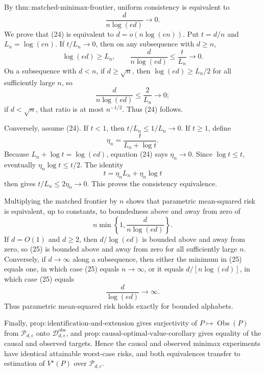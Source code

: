 By \(\mathrm{thm:matched\mbox{-}minimax\mbox{-}frontier}\), uniform consistency is equivalent to
\[
 \frac d{n\log(ed)}\longrightarrow0.                               \tag{24}
\]
We prove that (24) is equivalent to \(d=o(n\log(en))\).  Put \(t=d/n\) and \(L_n=\log(en)\).  If \(t/L_n\to0\), then on any subsequence with \(d\geq n\),
\[
 \log(ed)\geq L_n,
 \qquad
 \frac d{n\log(ed)}\leq\frac t{L_n}\longrightarrow0.
\]
On a subsequence with \(d<n\), if \(d\geq\sqrt n\), then \(\log(ed)\geq L_n/2\) for all sufficiently large \(n\), so
\[
 \frac d{n\log(ed)}\leq\frac2{L_n}\longrightarrow0;
\]
if \(d<\sqrt n\), that ratio is at most \(n^{-1/2}\).  Thus (24) follows.

Conversely, assume (24).  If \(t<1\), then \(t/L_n\leq1/L_n\to0\).  If \(t\geq1\), define
\[
 \eta_n=\frac{t}{L_n+\log t}.
\]
Because \(L_n+\log t=\log(ed)\), equation (24) says \(\eta_n\to0\).  Since \(\log t\leq t\), eventually \(\eta_n\log t\leq t/2\).  The identity
\[
 t=\eta_nL_n+\eta_n\log t
\]
then gives \(t/L_n\leq2\eta_n\to0\).  This proves the consistency equivalence.

Multiplying the matched frontier by \(n\) shows that parametric mean-squared risk is equivalent, up to constants, to boundedness above and away from zero of
\[
 n\min\left\{1,\frac d{n\log(ed)}\right\}.                         \tag{25}
\]
If \(d=O(1)\) and \(d\geq2\), then \(d/\log(ed)\) is bounded above and away from zero, so (25) is bounded above and away from zero for all sufficiently large \(n\).  Conversely, if \(d\to\infty\) along a subsequence, then either the minimum in (25) equals one, in which case (25) equals \(n\to\infty\), or it equals \(d/[n\log(ed)]\), in which case (25) equals
\[
 \frac d{\log(ed)}\longrightarrow\infty.
\]
Thus parametric mean-squared risk holds exactly for bounded alphabets.

Finally, \(\mathrm{prop:identification\mbox{-}and\mbox{-}extension}\) gives surjectivity of \(P\mapsto\operatorname{Obs}(P)\) from \(\mathcal P_{d,\epsilon}\) onto \(\mathcal D_{d,\epsilon}^{\mathrm{obs}}\), and \(\mathrm{prop:causal\mbox{-}optimal\mbox{-}value\mbox{-}corollary}\) gives equality of the causal and observed targets.  Hence the causal and observed minimax experiments have identical attainable worst-case risks, and both equivalences transfer to estimation of \(V^\star(P)\) over \(\mathcal P_{d,\epsilon}\).